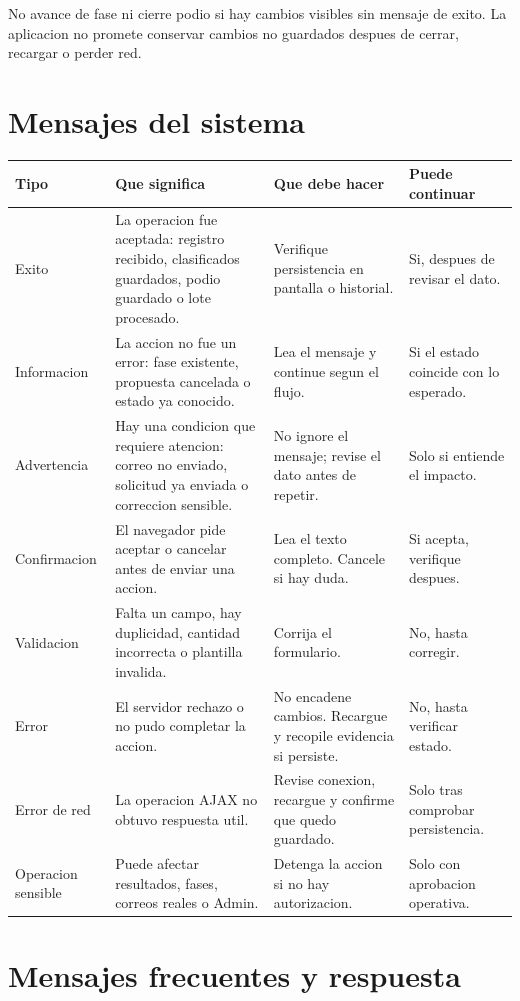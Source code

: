 \begin{advertencia}
No avance de fase ni cierre podio si hay cambios visibles sin mensaje de exito. La aplicacion no promete conservar cambios no guardados despues de cerrar, recargar o perder red.
\end{advertencia}

\section{Mensajes del sistema}

\begin{longtable}{p{2.5cm}p{4.2cm}p{4.1cm}p{2.7cm}}
\toprule
Tipo & Que significa & Que debe hacer & Puede continuar\\
\midrule
\endhead
Exito & La operacion fue aceptada: registro recibido, clasificados guardados, podio guardado o lote procesado. & Verifique persistencia en pantalla o historial. & Si, despues de revisar el dato.\\
Informacion & La accion no fue un error: fase existente, propuesta cancelada o estado ya conocido. & Lea el mensaje y continue segun el flujo. & Si el estado coincide con lo esperado.\\
Advertencia & Hay una condicion que requiere atencion: correo no enviado, solicitud ya enviada o correccion sensible. & No ignore el mensaje; revise el dato antes de repetir. & Solo si entiende el impacto.\\
Confirmacion & El navegador pide aceptar o cancelar antes de enviar una accion. & Lea el texto completo. Cancele si hay duda. & Si acepta, verifique despues.\\
Validacion & Falta un campo, hay duplicidad, cantidad incorrecta o plantilla invalida. & Corrija el formulario. & No, hasta corregir.\\
Error & El servidor rechazo o no pudo completar la accion. & No encadene cambios. Recargue y recopile evidencia si persiste. & No, hasta verificar estado.\\
Error de red & La operacion AJAX no obtuvo respuesta util. & Revise conexion, recargue y confirme que quedo guardado. & Solo tras comprobar persistencia.\\
Operacion sensible & Puede afectar resultados, fases, correos reales o Admin. & Detenga la accion si no hay autorizacion. & Solo con aprobacion operativa.\\
\bottomrule
\end{longtable}

\section{Mensajes frecuentes y respuesta}

